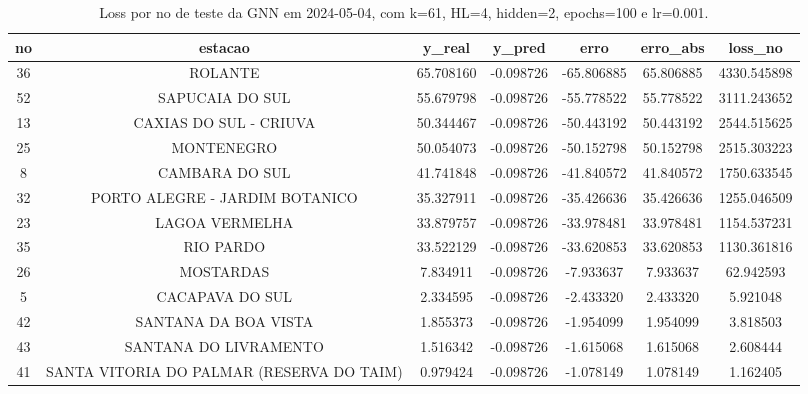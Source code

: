 \begin{table}[h]
\centering
\caption{Loss por no de teste da GNN em 2024-05-04, com k=61, HL=4, hidden=2, epochs=100 e lr=0.001.}
\label{tab:gnn_loss_k61_hl4_h2_e100_d20240504}
\begin{tabular}{ccccccc}
\toprule
no & estacao & y\_real & y\_pred & erro & erro\_abs & loss\_no \\
\midrule
36 & ROLANTE & 65.708160 & -0.098726 & -65.806885 & 65.806885 & 4330.545898 \\
52 & SAPUCAIA DO SUL & 55.679798 & -0.098726 & -55.778522 & 55.778522 & 3111.243652 \\
13 & CAXIAS DO SUL - CRIUVA & 50.344467 & -0.098726 & -50.443192 & 50.443192 & 2544.515625 \\
25 & MONTENEGRO & 50.054073 & -0.098726 & -50.152798 & 50.152798 & 2515.303223 \\
8 & CAMBARA DO SUL & 41.741848 & -0.098726 & -41.840572 & 41.840572 & 1750.633545 \\
32 & PORTO ALEGRE - JARDIM BOTANICO & 35.327911 & -0.098726 & -35.426636 & 35.426636 & 1255.046509 \\
23 & LAGOA VERMELHA & 33.879757 & -0.098726 & -33.978481 & 33.978481 & 1154.537231 \\
35 & RIO PARDO & 33.522129 & -0.098726 & -33.620853 & 33.620853 & 1130.361816 \\
26 & MOSTARDAS & 7.834911 & -0.098726 & -7.933637 & 7.933637 & 62.942593 \\
5 & CACAPAVA DO SUL & 2.334595 & -0.098726 & -2.433320 & 2.433320 & 5.921048 \\
42 & SANTANA DA BOA VISTA & 1.855373 & -0.098726 & -1.954099 & 1.954099 & 3.818503 \\
43 & SANTANA DO LIVRAMENTO & 1.516342 & -0.098726 & -1.615068 & 1.615068 & 2.608444 \\
41 & SANTA VITORIA DO PALMAR (RESERVA DO TAIM) & 0.979424 & -0.098726 & -1.078149 & 1.078149 & 1.162405 \\
\bottomrule
\end{tabular}
\end{table}

